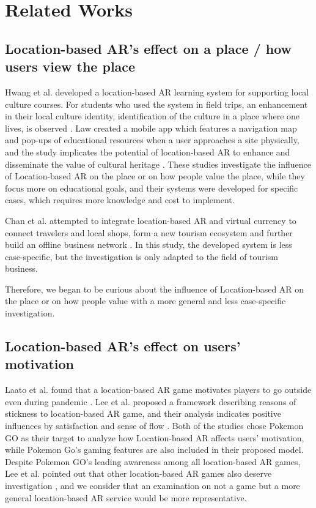 \chapter{Related Works} \label{ch:3}

\section{Location-based AR's effect on a place / how users view the place}
Hwang et al. developed a location-based AR learning system for supporting local culture courses.
For students who used the system in field trips, an enhancement in their local culture identity,
identification of the culture in a place where one lives, is observed \cite{hwang_chang_chen_chen_2017}.
Law created a mobile app which features a navigation map and pop-ups of educational resources when a user approaches a site physically,
and the study implicates the potential of location-based AR to enhance and disseminate the value of cultural heritage \cite{law_2018}.
These studies investigate the influence of Location-based AR on the place or on how people value the place,
while they focus more on educational goals, and their systems were developed for specific cases, which requires more knowledge and cost to implement.

Chan et al. attempted to integrate location-based AR and virtual currency to connect travelers and local shops,
form a new tourism ecosystem and further build an offline business network \cite{chan_lin_wang_lu_hsu_2017}.
In this study, the developed system is less case-specific, but the investigation is only adapted to the field of tourism business.

Therefore, we began to be curious about the influence of Location-based AR on the place or on how people value with a more general and less case-specific investigation.

\section{Location-based AR's effect on users' motivation}
Laato et al. found that a location-based AR game motivates players to go outside even during pandemic \cite{laato_islam_laine_2020}.
Lee et al. proposed a framework describing reasons of stickness to location-based AR game,
and their analysis indicates positive influences by satisfaction and sense of flow \cite{lee_chiang_hsiao_2018}.
Both of the studies chose Pokemon GO as their target to analyze how Location-based AR affects users' motivation,
while Pokemon Go's gaming features are also included in their proposed model.
Despite Pokemon GO's leading awareness among all location-based AR games,
Lee et al. pointed out that other location-based AR games also deserve investigation \cite{lee_chiang_hsiao_2018},
and we consider that an examination on not a game but a more general location-based AR service would be more representative.

